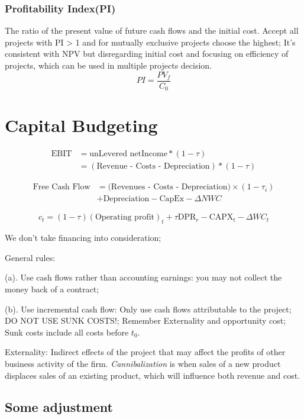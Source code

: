 \documentclass[10pt, a4paper]{article}
\begin{document}
            \subsubsection{Profitability Index(PI)}
                The ratio of the present value of future cash flows and the initial cost. Accept all projects with PI > 1 and for mutually exclusive projects choose the highest; It's consistent with NPV but disregarding initial cost and focusing on efficiency of projects, which can be used in multiple projects decision. 
                $$PI = \frac{PV_f}{C_0}$$
\newpage
    \section{Capital Budgeting}
    $$\begin{aligned}
        \text{EBIT} &= \text{unLevered netIncome} * (1 - \tau) \\
            &= (\text{Revenue - Costs - Depreciation}) * (1 - \tau)
    \end{aligned}$$

    $$\begin{aligned}
                \text{Free Cash Flow} &=
            \text{(Revenues - Costs - Depreciation)} \times (1 - \tau_i) \\
            &+ \text{Depreciation} - \text{CapEx} - \Delta NWC
            \end{aligned}$$
    
    $$c_t = (1 - \tau)(\text{Operating profit})_t + \tau \text{DPR}_r - \text{CAPX}_t - \Delta WC_t$$

    We don't take financing into consideration;

    General rules: 

    \quad(a). Use cash flows rather than accounting earnings: you may not collect the money back of a contract; 
    
    \quad(b). Use incremental cash flow: Only use cash flows attributable to the project; DO NOT USE SUNK COSTS!; Remember Externality and opportunity cost; Sunk costs include all costs before $t_0$. 

    Externality: Indirect effects of the project that may affect the profits of other business activity of the firm. \emph{Cannibalization} is when sales of a new product displaces sales of an existing product, which will influence both revenue and cost.
    

    \subsection{Some adjustment}
\end{document}
